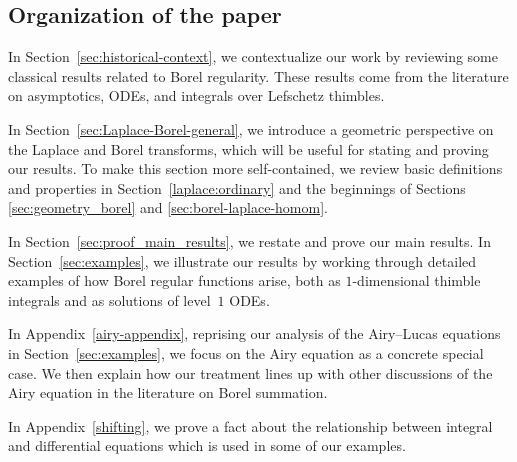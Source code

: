 \documentclass{article}
\theoremstyle{definition}
\theoremstyle{plain}
\begin{document}
\subsection{Organization of the paper}\label{sec:org}
%
In Section~\ref{sec:historical-context}, we contextualize our work by reviewing some classical results related to Borel regularity. These results come from the literature on asymptotics, ODEs, and integrals over Lefschetz thimbles.

In Section~\ref{sec:Laplace-Borel-general}, we introduce a geometric perspective on the Laplace and Borel transforms, which will be useful for stating and proving our results. To make this section more self-contained, we review basic definitions and properties in Section~\ref{laplace:ordinary} and the beginnings of Sections \ref{sec:geometry_borel} and \ref{sec:borel-laplace-homom}.

In Section~\ref{sec:proof_main_results}, we restate and prove our main results. In Section~\ref{sec:examples}, we illustrate our results by working through detailed examples of how Borel regular functions arise, both as $1$-dimensional thimble integrals and as solutions of level~$1$ ODEs.

In Appendix~\ref{airy-appendix}, reprising our analysis of the Airy--Lucas equations in Section~\ref{sec:examples}, we focus on the Airy equation as a concrete special case. We then explain how our treatment lines up with other discussions of the Airy equation in the literature on Borel summation.

In Appendix~\ref{shifting}, we prove a fact about the relationship between integral and differential equations which is used in some of our examples.
%
\end{document}
